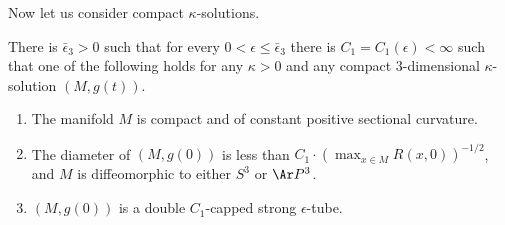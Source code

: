 Now let us consider compact $\kappa$-solutions.



\begin{theorem}\label{thm:compact-kappa-solution-structure}
\label{thmep3}
There is $\bar \epsilon_3>0$ such that for every $0<\epsilon\le \bar
\epsilon_3$  there is $C_1=C_1(\epsilon)<\infty$ such that one of
the following holds for any $\kappa>0$ and any compact
$3$-dimensional $\kappa$-solution $(M,g(t))$.
\begin{enumerate}
\item[(1)] The manifold $M$ is compact and of constant positive sectional curvature.
\item[(2)] The diameter of $(M,g(0))$ is  less than $C_1\cdot (\max_{x\in
M}R(x,0))^{-1/2}$, and $M$ is diffeomorphic to either $S^3$ or $\Ar
P^3$.
\item[(3)] $(M,g(0))$
 is  a double  $C_1$-capped  strong $\epsilon$-tube.
\end{enumerate}
\end{theorem}


